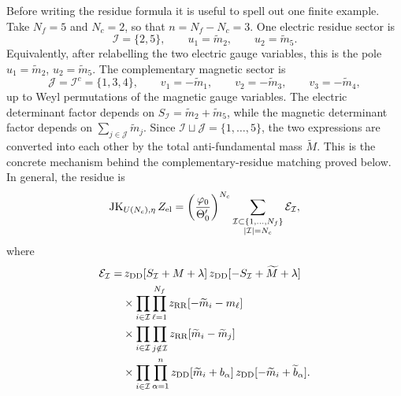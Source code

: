 \documentclass[11pt,a4paper]{article}
\numberwithin{equation}{section}
\theoremstyle{plain}
\theoremstyle{definition}
\theoremstyle{remark}
\begin{document}
Before writing the residue formula it is useful to spell out one finite example. Take \(N_f=5\) and \(N_c=2\), so that \(n=N_f-N_c=3\).  One electric residue sector is
\begin{equation}
\mathcal I=\{2,5\},
\qquad
u_1=\widetilde m_2,
\qquad
u_2=\widetilde m_5.
\label{eq:numerical-pole-example-electric}
\end{equation}
Equivalently, after relabelling the two electric gauge variables, this is the pole \(u_1=\widetilde m_2\), \(u_2=\widetilde m_5\).  The complementary magnetic sector is
\begin{equation}
\mathcal J=\mathcal I^c=\{1,3,4\},
\qquad
v_1=-\widetilde m_1,
\qquad
v_2=-\widetilde m_3,
\qquad
v_3=-\widetilde m_4,
\label{eq:numerical-pole-example-magnetic}
\end{equation}
up to Weyl permutations of the magnetic gauge variables.  The electric determinant factor depends on \(S_{\mathcal I}=\widetilde m_2+\widetilde m_5\), while the magnetic determinant factor depends on \(\sum_{j\in\mathcal J}\widetilde m_j\).  Since \(\mathcal I\sqcup\mathcal J=\{1,\ldots,5\}\), the two expressions are converted into each other by the total anti-fundamental mass \(\widetilde M\).  This is the concrete mechanism behind the complementary-residue matching proved below.
In general, the residue is
\begin{equation}
\operatorname{JK}_{U(N_c),\eta}Z_{\rm el}
=
\left(\frac{\varphi_0}{\Theta'_0}\right)^{N_c}
\sum_{\substack{\mathcal I\subset\{1,\ldots,N_f\}\\ |\mathcal I|=N_c}}
\mathcal E_{\mathcal I},
\label{eq:JK-el-UNc-reint}
\end{equation}
where
\begin{equation}
\begin{aligned}
\mathcal E_{\mathcal I}
=&\,
z_{\rm DD}[S_{\mathcal I}+M+\lambda]\,
z_{\rm DD}[-S_{\mathcal I}+\widetilde M+\lambda]
\\
&\times
\prod_{i\in\mathcal I}\prod_{\ell=1}^{N_f}
z_{\rm RR}[-\widetilde m_i-m_\ell]
\\
&\times
\prod_{i\in\mathcal I}\prod_{j\notin\mathcal I}
z_{\rm RR}[\widetilde m_i-\widetilde m_j]
\\
&\times
\prod_{i\in\mathcal I}\prod_{\alpha=1}^{n}
z_{\rm DD}[\widetilde m_i+b_\alpha]\,
z_{\rm DD}[-\widetilde m_i+\widetilde b_\alpha] .
\end{aligned}
\label{eq:electric-residue-UNc-reint}
\end{equation}
\end{document}
